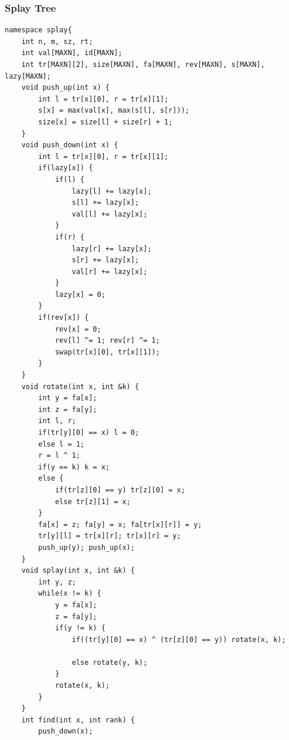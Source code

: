 \documentclass[10pt]{ctexart}
\begin{document}
{\subsubsection{Splay Tree}
\begin{lstlisting}
namespace splay{
    int n, m, sz, rt;
    int val[MAXN], id[MAXN];
    int tr[MAXN][2], size[MAXN], fa[MAXN], rev[MAXN], s[MAXN], lazy[MAXN];
    void push_up(int x) {
        int l = tr[x][0], r = tr[x][1];
        s[x] = max(val[x], max(s[l], s[r]));
        size[x] = size[l] + size[r] + 1;
    }
    void push_down(int x) {
        int l = tr[x][0], r = tr[x][1];
        if(lazy[x]) {
            if(l) {
                lazy[l] += lazy[x];
                s[l] += lazy[x];
                val[l] += lazy[x];
            }
            if(r) {
                lazy[r] += lazy[x];
                s[r] += lazy[x];
                val[r] += lazy[x];
            }
            lazy[x] = 0;
        }
        if(rev[x]) {
            rev[x] = 0;
            rev[l] ^= 1; rev[r] ^= 1;
            swap(tr[x][0], tr[x][1]);
        }
    }
    void rotate(int x, int &k) {
        int y = fa[x];
        int z = fa[y];
        int l, r;
        if(tr[y][0] == x) l = 0;
        else l = 1;
        r = l ^ 1;
        if(y == k) k = x;
        else {
            if(tr[z][0] == y) tr[z][0] = x;
            else tr[z][1] = x;
        }
        fa[x] = z; fa[y] = x; fa[tr[x][r]] = y;
        tr[y][l] = tr[x][r]; tr[x][r] = y;
        push_up(y); push_up(x);
    }
    void splay(int x, int &k) {
        int y, z;
        while(x != k) {
            y = fa[x];
            z = fa[y];
            if(y != k) {
                if((tr[y][0] == x) ^ (tr[z][0] == y)) rotate(x, k);

                else rotate(y, k);
            }
            rotate(x, k);
        }
    }
    int find(int x, int rank) {
        push_down(x);


\end{lstlisting}}
\end{document}
